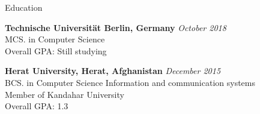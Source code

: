 \documentclass{resume} %
\begin{document}

\begin{rSection}{Education}



{\bf Technische Universität Berlin, Germany} \hfill {\em October 2018} \\ 
MCS. in Computer Science \smallskip \\
Overall GPA: Still studying


{\bf Herat University, Herat, Afghanistan} \hfill {\em December 2015} \\ 
BCS. in Computer Science
Information and communication systems \\
Member of Kandahar University \\
Overall GPA: 1.3




\end{rSection}

\end{document}
